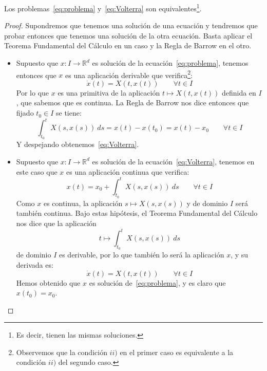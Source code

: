 \begin{prop}
    Los problemas~\eqref{eq:problema} y~\eqref{eq:Volterra} son equivalentes\footnote{Es decir, tienen las mismas soluciones.}.
    \begin{proof}
        Supondremos que tenemos una solución de una ecuación y tendremos que probar entonces que tenemos una solución de la otra ecuación. Basta aplicar el Teorema Fundamental del Cálculo en un caso y la Regla de Barrow en el otro.
        \begin{itemize}
            \item Supuesto que $x:I\to \mathbb{R}^d$ es solución de la ecuación~\eqref{eq:problema}, tenemos entonces que $x$ es una aplicación derivable que verifica\footnote{Observemos que la condición $ii)$ en el primer caso es equivalente a la condición $ii)$ del segundo caso.}:
                \begin{equation*}
                    \dot{x}(t) = X(t,x(t)) \qquad \forall t\in I
                \end{equation*}
                Por lo que $x$ es una primitiva de la aplicación $t\mapsto X(t,x(t))$ definida en $I$, que sabemos que es continua. La Regla de Barrow nos dice entonces que fijado $t_0\in I$ se tiene:
                \begin{equation*}
                    \int_{t_0}^{t} X(s,x(s))~ds = x(t) - x(t_0) = x(t) - x_0 \qquad \forall t\in I
                \end{equation*}
                Y despejando obtenemos~\eqref{eq:Volterra}.
            \item Supuesto que $x:I\to \mathbb{R}^d$ es solución de la ecuación~\eqref{eq:Volterra}, tenemos en este caso que $x$ es una aplicación continua que verifica:
                \begin{equation*}
                    x(t) = x_0 + \int_{t_0}^{t} X(s,x(s))~ds  \qquad \forall t\in I
                \end{equation*}
                Como $x$ es continua, la aplicación $s\mapsto X(s,x(s))$ y de dominio $I$ será también continua. Bajo estas hipótesis, el Teorema Fundamental del Cálculo nos dice que la aplicación
                \begin{equation*}
                    t\longmapsto \int_{t_0}^{t} X(s,x(s))~ds 
                \end{equation*}
                de dominio $I$ es derivable, por lo que también lo será la aplicación $x$, y su derivada es:
                \begin{equation*}
                    \dot{x}(t) = X(t,x(t)) \qquad \forall t\in I
                \end{equation*}
                Hemos obtenido que $x$ es solución de~\eqref{eq:problema}, y es claro que $x(t_0) = x_0$.
        \end{itemize}
    \end{proof}
\end{prop}

